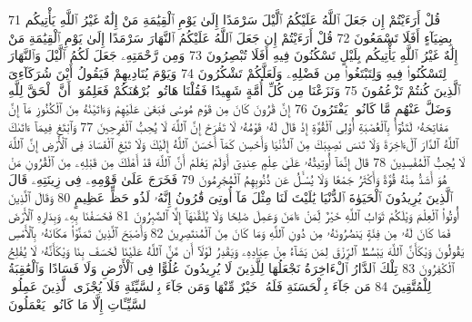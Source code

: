 {\tiny\colorbox{cl_aya}{71}} قُلْ أَرَءَيْتُمْ إِن جَعَلَ ٱللَّهُ عَلَيْكُمُ ٱلَّيْلَ سَرْمَدًا إِلَىٰ يَوْمِ ٱلْقِيَٰمَةِ مَنْ إِلَٰهٌ غَيْرُ ٱللَّهِ يَأْتِيكُم بِضِيَآءٍ أَفَلَا تَسْمَعُونَ
{\tiny\colorbox{cl_aya}{72}} قُلْ أَرَءَيْتُمْ إِن جَعَلَ ٱللَّهُ عَلَيْكُمُ ٱلنَّهَارَ سَرْمَدًا إِلَىٰ يَوْمِ ٱلْقِيَٰمَةِ مَنْ إِلَٰهٌ غَيْرُ ٱللَّهِ يَأْتِيكُم بِلَيْلٍ تَسْكُنُونَ فِيهِ أَفَلَا تُبْصِرُونَ
{\tiny\colorbox{cl_aya}{73}} وَمِن رَّحْمَتِهِۦ جَعَلَ لَكُمُ ٱلَّيْلَ وَٱلنَّهَارَ لِتَسْكُنُوا۟ فِيهِ وَلِتَبْتَغُوا۟ مِن فَضْلِهِۦ وَلَعَلَّكُمْ تَشْكُرُونَ
{\tiny\colorbox{cl_aya}{74}} وَيَوْمَ يُنَادِيهِمْ فَيَقُولُ أَيْنَ شُرَكَآءِىَ ٱلَّذِينَ كُنتُمْ تَزْعُمُونَ
{\tiny\colorbox{cl_aya}{75}} وَنَزَعْنَا مِن كُلِّ أُمَّةٍ شَهِيدًا فَقُلْنَا هَاتُوا۟ بُرْهَٰنَكُمْ فَعَلِمُوٓا۟ أَنَّ ٱلْحَقَّ لِلَّهِ وَضَلَّ عَنْهُم مَّا كَانُوا۟ يَفْتَرُونَ
{\tiny\colorbox{cl_aya}{76}} إِنَّ قَٰرُونَ كَانَ مِن قَوْمِ مُوسَىٰ فَبَغَىٰ عَلَيْهِمْ وَءَاتَيْنَٰهُ مِنَ ٱلْكُنُوزِ مَآ إِنَّ مَفَاتِحَهُۥ لَتَنُوٓأُ بِٱلْعُصْبَةِ أُو۟لِى ٱلْقُوَّةِ إِذْ قَالَ لَهُۥ قَوْمُهُۥ لَا تَفْرَحْ إِنَّ ٱللَّهَ لَا يُحِبُّ ٱلْفَرِحِينَ
{\tiny\colorbox{cl_aya}{77}} وَٱبْتَغِ فِيمَآ ءَاتَىٰكَ ٱللَّهُ ٱلدَّارَ ٱلْءَاخِرَةَ وَلَا تَنسَ نَصِيبَكَ مِنَ ٱلدُّنْيَا وَأَحْسِن كَمَآ أَحْسَنَ ٱللَّهُ إِلَيْكَ وَلَا تَبْغِ ٱلْفَسَادَ فِى ٱلْأَرْضِ إِنَّ ٱللَّهَ لَا يُحِبُّ ٱلْمُفْسِدِينَ
{\tiny\colorbox{cl_aya}{78}} قَالَ إِنَّمَآ أُوتِيتُهُۥ عَلَىٰ عِلْمٍ عِندِىٓ أَوَلَمْ يَعْلَمْ أَنَّ ٱللَّهَ قَدْ أَهْلَكَ مِن قَبْلِهِۦ مِنَ ٱلْقُرُونِ مَنْ هُوَ أَشَدُّ مِنْهُ قُوَّةً وَأَكْثَرُ جَمْعًا وَلَا يُسْـَٔلُ عَن ذُنُوبِهِمُ ٱلْمُجْرِمُونَ
{\tiny\colorbox{cl_aya}{79}} فَخَرَجَ عَلَىٰ قَوْمِهِۦ فِى زِينَتِهِۦ قَالَ ٱلَّذِينَ يُرِيدُونَ ٱلْحَيَوٰةَ ٱلدُّنْيَا يَٰلَيْتَ لَنَا مِثْلَ مَآ أُوتِىَ قَٰرُونُ إِنَّهُۥ لَذُو حَظٍّ عَظِيمٍ
{\tiny\colorbox{cl_aya}{80}} وَقَالَ ٱلَّذِينَ أُوتُوا۟ ٱلْعِلْمَ وَيْلَكُمْ ثَوَابُ ٱللَّهِ خَيْرٌ لِّمَنْ ءَامَنَ وَعَمِلَ صَٰلِحًا وَلَا يُلَقَّىٰهَآ إِلَّا ٱلصَّٰبِرُونَ
{\tiny\colorbox{cl_aya}{81}} فَخَسَفْنَا بِهِۦ وَبِدَارِهِ ٱلْأَرْضَ فَمَا كَانَ لَهُۥ مِن فِئَةٍ يَنصُرُونَهُۥ مِن دُونِ ٱللَّهِ وَمَا كَانَ مِنَ ٱلْمُنتَصِرِينَ
{\tiny\colorbox{cl_aya}{82}} وَأَصْبَحَ ٱلَّذِينَ تَمَنَّوْا۟ مَكَانَهُۥ بِٱلْأَمْسِ يَقُولُونَ وَيْكَأَنَّ ٱللَّهَ يَبْسُطُ ٱلرِّزْقَ لِمَن يَشَآءُ مِنْ عِبَادِهِۦ وَيَقْدِرُ لَوْلَآ أَن مَّنَّ ٱللَّهُ عَلَيْنَا لَخَسَفَ بِنَا وَيْكَأَنَّهُۥ لَا يُفْلِحُ ٱلْكَٰفِرُونَ
{\tiny\colorbox{cl_aya}{83}} تِلْكَ ٱلدَّارُ ٱلْءَاخِرَةُ نَجْعَلُهَا لِلَّذِينَ لَا يُرِيدُونَ عُلُوًّا فِى ٱلْأَرْضِ وَلَا فَسَادًا وَٱلْعَٰقِبَةُ لِلْمُتَّقِينَ
{\tiny\colorbox{cl_aya}{84}} مَن جَآءَ بِٱلْحَسَنَةِ فَلَهُۥ خَيْرٌ مِّنْهَا وَمَن جَآءَ بِٱلسَّيِّئَةِ فَلَا يُجْزَى ٱلَّذِينَ عَمِلُوا۟ ٱلسَّيِّـَٔاتِ إِلَّا مَا كَانُوا۟ يَعْمَلُونَ
